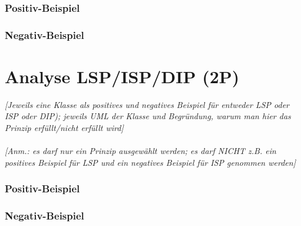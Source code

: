 \subsubsection{Positiv-Beispiel}
\subsubsection{Negativ-Beispiel}

\section{Analyse LSP/ISP/DIP (2P)}
\emph{[Jeweils eine Klasse als positives und negatives Beispiel für entweder LSP oder ISP oder DIP); jeweils
UML der Klasse und Begründung, warum man hier das Prinzip erfüllt/nicht erfüllt wird]}
\\
\\
\emph{[Anm.: es darf nur ein Prinzip ausgewählt werden; es darf NICHT z.B. ein positives Beispiel für LSP
und ein negatives Beispiel für ISP genommen werden]}

\subsubsection{Positiv-Beispiel}
\subsubsection{Negativ-Beispiel}